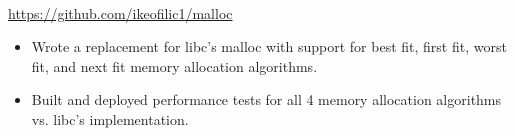 \\
{\url{https://github.com/ikeofilic1/malloc}}
\begin{itemize}
    \item Wrote a replacement for libc's malloc with support for best fit, first fit, worst fit, and next fit memory allocation algorithms.
    \item Built and deployed performance tests for all 4 memory allocation algorithms vs. libc's implementation.
\end{itemize}
